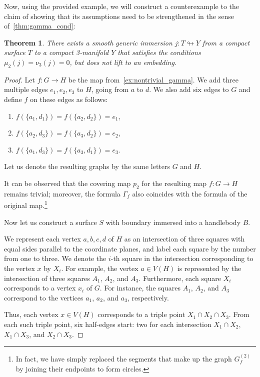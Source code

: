 \documentclass[a4paper,12pt,reqno,oneside]{amsart}
\theoremstyle{plain}
\newtheorem{theorem}{Theorem}
\theoremstyle{definition}
\theoremstyle{plain}
\newcommand{\from}{\colon}
\begin{document}
Now, using the provided example, we will construct a counterexample to the claim of \cite[Th\'{e}or\`{e}me
1]{poen_fr} showing that its assumptions need to be strengthened in the sense of~\cref{thm:gamma_cond}:

\begin{theorem}\label{thm:counterexample}
  There exists a smooth generic immersion $j \from T \looparrowright Y$ from a compact surface $T$
  to a compact 3-manifold $Y$ that satisfies the conditions $\mu_2(j) = \nu_3(j) = 0$, but does not lift
  to an embedding.
\end{theorem}
\begin{proof}
  Let $f \from G \to H$ be the map from~\cref{ex:nontrivial_gamma}. We add three multiple edges
  $e_1, e_2, e_3$ to $H$, going from $a$ to $d$. We also add six edges to $G$ and define $f$ on
  these edges as follows:
  \begin{enumerate}
  \item $f(\{a_1, d_1\}) = f(\{a_2, d_2\}) = e_1$,
  \item $f(\{a_2, d_3\}) = f(\{a_3, d_2\}) = e_2$,
  \item $f(\{a_1, d_3\}) = f(\{a_3, d_1\}) = e_3$.
  \end{enumerate}

  Let us denote the resulting graphs by the same letters $G$ and $H$.

  It can be observed that the covering map $p_2$ for the resulting map $f \from G \to H$ remains
  trivial; moreover, the formula $\Gamma_f$ also coincides with the formula of the original
  map.\footnote{In fact, we have simply replaced the segments that make up the graph $G^{(2)}_f$ by
    joining their endpoints to form circles.}

  Now let us construct a surface $S$ with boundary immersed into a handlebody $B$.

  We represent each vertex $a, b, c, d$ of $H$ as an intersection of three squares with equal sides
  parallel to the coordinate planes, and label each square by the number from one to three. We
  denote the $i$-th square in the intersection corresponding to the vertex $x$ by $X_i$. For
  example, the vertex $a \in V(H)$ is represented by the intersection of three squares $A_1$, $A_2$,
  and $A_3$. Furthermore, each square $X_i$ corresponds to a vertex $x_i$ of $G$. For instance, the
  squares $A_1$, $A_2$, and $A_3$ correspond to the vertices $a_1$, $a_2$, and $a_3$, respectively.

  Thus, each vertex $x \in V(H)$ corresponds to a triple point $X_1 \cap X_2 \cap X_3$. From each
  such triple point, six half-edges start: two for each intersection $X_1 \cap X_2$, $X_1 \cap X_3$,
  and $X_2 \cap X_3$.


\end{proof}
\end{document}

